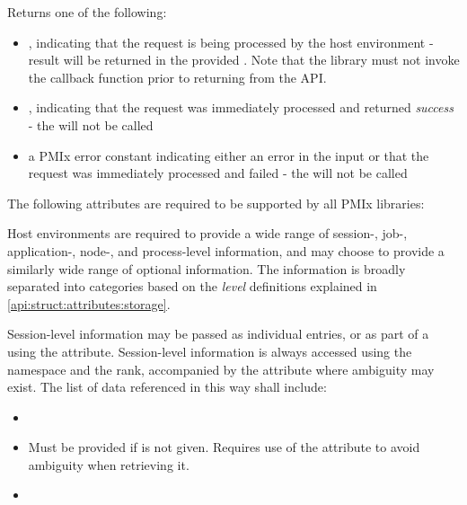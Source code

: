 Returns one of the following:

\begin{itemize}
    \item {}, indicating that the request is being processed by the host environment - result will be returned in the provided . Note that the library must not invoke the callback function prior to returning from the \ac{API}.
    \item {}, indicating that the request was immediately processed and returned \textit{success} - the  will not be called
    \item a PMIx error constant indicating either an error in the input or that the request was immediately processed and failed - the  will not be called
\end{itemize}

\reqattrstart
The following attributes are required to be supported by all \ac{PMIx} libraries:


\divider

Host environments are required to provide a wide range of session-, job-, application-, node-, and process-level information, and may choose to provide a similarly wide range of optional information. The information is broadly separated into categories based on the \emph{level} definitions explained in \ref{api:struct:attributes:storage}.

Session-level information may be passed as individual  entries, or as part of a  using the  attribute. Session-level information is always accessed using the namespace and the  rank, accompanied by the  attribute where ambiguity may exist. The list of data referenced in this way shall include:

\begin{itemize}
    \item {}
    \item {}Must be provided if  is not given. Requires use of the  attribute to avoid ambiguity when retrieving it.
    \pasteAttributeItemEnd
    \item {}
\end{itemize}

